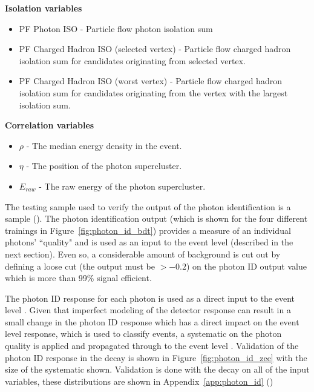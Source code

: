 \noindent\textbf{Isolation variables}
\begin{itemize}
  \item PF Photon ISO - Particle flow photon isolation sum
  \item PF Charged Hadron ISO (selected vertex) - Particle flow charged hadron isolation sum for candidates originating from selected vertex.
  \item PF Charged Hadron ISO (worst vertex) - Particle flow charged hadron isolation sum for candidates originating from the vertex with the largest isolation sum.
\end{itemize}

\noindent\textbf{Correlation variables}
\begin{itemize}
  \item $\rho$ - The median energy density in the event.
  \item $\eta$ - The \eta position of the photon supercluster.
  \item $E_{raw}$ - The raw energy of the photon supercluster.
\end{itemize}

The testing sample used to verify the output of the photon identification \BDT is a \MC \Hgg sample (\GeV). The photon identification \BDT output (which is shown for the four different trainings in Figure~\ref{fig:photon_id_bdt}) provides a measure of an individual photons' ``quality" and is used as an input to the event level \BDT (described in the next section). Even so, a considerable amount of background is cut out by defining a loose cut (the \BDT output must be $>-0.2$) on the photon ID \BDT output value which is more than 99\% signal efficient.

The photon ID \BDT response for each photon is used as a direct input to the event level \MVA. Given that imperfect modeling of the detector response can result in a small change in the photon ID response which has a direct impact on the event level \MVA response, which is used to classify events, a systematic on the photon quality is applied and propagated through to the event level \MVA. Validation of the photon ID \BDT response in the \Zee decay is shown in Figure~\ref{fig:photon_id_zee} with the size of the systematic shown. Validation is done with the \Zee decay on all of the input variables, these distributions are shown in Appendix~\ref{app:photon_id} ()


